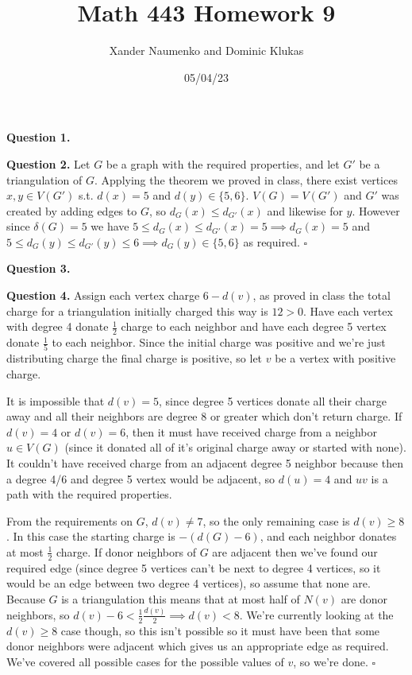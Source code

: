 \documentclass[letterpaper, reqno,11pt]{article}
\begin{document}
\title{Math 443 Homework 9}
\date{05/04/23}
\author{Xander Naumenko and Dominic Klukas}
\maketitle

{\medskip\noindent\bf Question 1.}  

{\medskip\noindent\bf Question 2.} Let $G$ be a graph with the required properties, and let $G'$ be a triangulation of $G$. Applying the theorem we proved in class, there exist vertices $x,y\in V(G')$ s.t. $d(x)=5$ and $d(y)\in \{5,6\} $. $V(G)=V(G')$ and $G'$ was created by adding edges to $G$, so $d_G(x)\leq d_{G'}(x)$ and likewise for $y$. However since $\delta(G)=5$ we have $5\leq d_{G}(x)\leq d_{G'}(x)=5 \implies d_{G}(x)=5$ and $5\leq d_G(y)\leq d_{G'}(y)\leq 6 \implies d_{G}(y)\in \{5,6\} $ as required. $\square$

{\medskip\noindent\bf Question 3.} 

{\medskip\noindent\bf Question 4.} Assign each vertex charge $6-d(v)$, as proved in class the total charge for a triangulation initially charged this way is $12>0$. Have each vertex with degree 4 donate $\frac{1}{2}$ charge to each neighbor and have each degree 5 vertex donate $\frac{1}{5}$ to each neighbor. Since the initial charge was positive and we're just distributing charge the final charge is positive, so let $v$ be a vertex with positive charge. 

It is impossible that $d(v)=5$, since degree 5 vertices donate all their charge away and all their neighbors are degree 8 or greater which don't return charge. If $d(v)=4$ or $d(v)=6$, then it must have received charge from a neighbor $u\in V(G)$ (since it donated all of it's original charge away or started with none). It couldn't have received charge from an adjacent degree 5 neighbor because then a degree 4/6 and degree 5 vertex would be adjacent, so $d(u)=4$ and $uv$ is a path with the required properties.

From the requirements on $G$, $d(v)\neq 7$, so the only remaining case is $d(v)\geq 8$. In this case the starting charge is $-(d(G)-6)$, and each neighbor donates at most $\frac{1}{2}$ charge. If donor neighbors of $G$ are adjacent then we've found our required edge (since degree 5 vertices can't be next to degree 4 vertices, so it would be an edge between two degree 4 vertices), so assume that none are. Because $G$ is a triangulation this means that at most half of $N(v)$ are donor neighbors, so $d(v)-6 < \frac{1}{2}\frac{d(v)}{2}\implies d(v)<8$. We're currently looking at the $d(v)\geq 8$ case though, so this isn't possible so it must have been that some donor neighbors were adjacent which gives us an appropriate edge as required. We've covered all possible cases for the possible values of $v$, so we're done. $\square$
\end{document}
